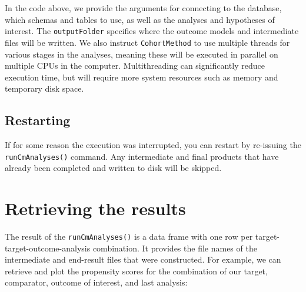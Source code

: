 \documentclass[
]{article}
\newenvironment{Shaded}{\begin{snugshade}}{\end{snugshade}}
\newcommand{\DecValTok}[1]{\textcolor[rgb]{0.00,0.00,0.81}{#1}}
\newcommand{\KeywordTok}[1]{\textcolor[rgb]{0.13,0.29,0.53}{\textbf{#1}}}
\newcommand{\NormalTok}[1]{#1}
\newcommand{\OperatorTok}[1]{\textcolor[rgb]{0.81,0.36,0.00}{\textbf{#1}}}
\newcommand{\StringTok}[1]{\textcolor[rgb]{0.31,0.60,0.02}{#1}}
\begin{document}
In the code above, we provide the arguments for connecting to the
database, which schemas and tables to use, as well as the analyses and
hypotheses of interest. The \texttt{outputFolder} specifies where the
outcome models and intermediate files will be written. We also instruct
\texttt{CohortMethod} to use multiple threads for various stages in the
analyses, meaning these will be executed in parallel on multiple CPUs in
the computer. Multithreading can significantly reduce execution time,
but will require more system resources such as memory and temporary disk
space.

\hypertarget{restarting}{%
\subsection{Restarting}\label{restarting}}

If for some reason the execution was interrupted, you can restart by
re-issuing the \texttt{runCmAnalyses()} command. Any intermediate and
final products that have already been completed and written to disk will
be skipped.

\hypertarget{retrieving-the-results}{%
\section{Retrieving the results}\label{retrieving-the-results}}

The result of the \texttt{runCmAnalyses()} is a data frame with one row
per target-target-outcome-analysis combination. It provides the file
names of the intermediate and end-result files that were constructed.
For example, we can retrieve and plot the propensity scores for the
combination of our target, comparator, outcome of interest, and last
analysis:

\begin{Shaded}
\end{Shaded}
\end{document}

